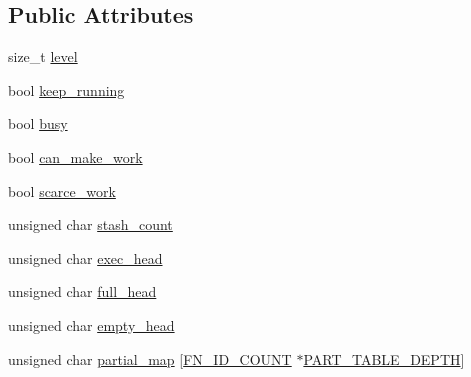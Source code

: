 \subsection*{Public Attributes}
\begin{DoxyCompactItemize}
\item 
size\-\_\-t \hyperlink{structHarmonizeProgram_3_01PromiseUnion_3_01FN__IDS_8_8_8_4_00	PROGRAM__STATE_00	ADR__TYPE_00	ST0a79cb977383bd6040caaad90f5c572e_a5c6e2795171b8917dc22d456883ae64a}{level}
\item 
bool \hyperlink{structHarmonizeProgram_3_01PromiseUnion_3_01FN__IDS_8_8_8_4_00	PROGRAM__STATE_00	ADR__TYPE_00	ST0a79cb977383bd6040caaad90f5c572e_aa19b62ed5d4b894feaf873c07c152a22}{keep\-\_\-running}
\item 
bool \hyperlink{structHarmonizeProgram_3_01PromiseUnion_3_01FN__IDS_8_8_8_4_00	PROGRAM__STATE_00	ADR__TYPE_00	ST0a79cb977383bd6040caaad90f5c572e_a542111d176cf9dde13dbf267011ba6c1}{busy}
\item 
bool \hyperlink{structHarmonizeProgram_3_01PromiseUnion_3_01FN__IDS_8_8_8_4_00	PROGRAM__STATE_00	ADR__TYPE_00	ST0a79cb977383bd6040caaad90f5c572e_a9e984f45a132edc6a800a53e67c42e37}{can\-\_\-make\-\_\-work}
\item 
bool \hyperlink{structHarmonizeProgram_3_01PromiseUnion_3_01FN__IDS_8_8_8_4_00	PROGRAM__STATE_00	ADR__TYPE_00	ST0a79cb977383bd6040caaad90f5c572e_a72a7ee7a44c74a273c983ee96aefd541}{scarce\-\_\-work}
\item 
unsigned char \hyperlink{structHarmonizeProgram_3_01PromiseUnion_3_01FN__IDS_8_8_8_4_00	PROGRAM__STATE_00	ADR__TYPE_00	ST0a79cb977383bd6040caaad90f5c572e_aac3ebafb4fdb3a7eb674787acfdd6339}{stash\-\_\-count}
\item 
unsigned char \hyperlink{structHarmonizeProgram_3_01PromiseUnion_3_01FN__IDS_8_8_8_4_00	PROGRAM__STATE_00	ADR__TYPE_00	ST0a79cb977383bd6040caaad90f5c572e_a4986fc2871787477a49dc28120587b2b}{exec\-\_\-head}
\item 
unsigned char \hyperlink{structHarmonizeProgram_3_01PromiseUnion_3_01FN__IDS_8_8_8_4_00	PROGRAM__STATE_00	ADR__TYPE_00	ST0a79cb977383bd6040caaad90f5c572e_ab3c621f383a9afad4b5fbc622bea50cb}{full\-\_\-head}
\item 
unsigned char \hyperlink{structHarmonizeProgram_3_01PromiseUnion_3_01FN__IDS_8_8_8_4_00	PROGRAM__STATE_00	ADR__TYPE_00	ST0a79cb977383bd6040caaad90f5c572e_aa1f9ff82a07ac8c4115102a96a472c02}{empty\-\_\-head}
\item 
unsigned char \hyperlink{structHarmonizeProgram_3_01PromiseUnion_3_01FN__IDS_8_8_8_4_00	PROGRAM__STATE_00	ADR__TYPE_00	ST0a79cb977383bd6040caaad90f5c572e_a0164c4f7b48f5524243ecc3c88bf07f8}{partial\-\_\-map} \mbox{[}\hyperlink{structHarmonizeProgram_3_01PromiseUnion_3_01FN__IDS_8_8_8_4_00	PROGRAM__STATE_00	ADR__TYPE_00	ST96305cc1a177b714bc64a5044f46c97c_a65d8dc32f58986606647fbe2132fe9cd}{F\-N\-\_\-\-I\-D\-\_\-\-C\-O\-U\-N\-T} $\ast$\hyperlink{structHarmonizeProgram_3_01PromiseUnion_3_01FN__IDS_8_8_8_4_00	PROGRAM__STATE_00	ADR__TYPE_00	ST96305cc1a177b714bc64a5044f46c97c_a39ee806efb203bec096738c0c78d4202}{P\-A\-R\-T\-\_\-\-T\-A\-B\-L\-E\-\_\-\-D\-E\-P\-T\-H}\mbox{]}

\end{DoxyCompactItemize}

